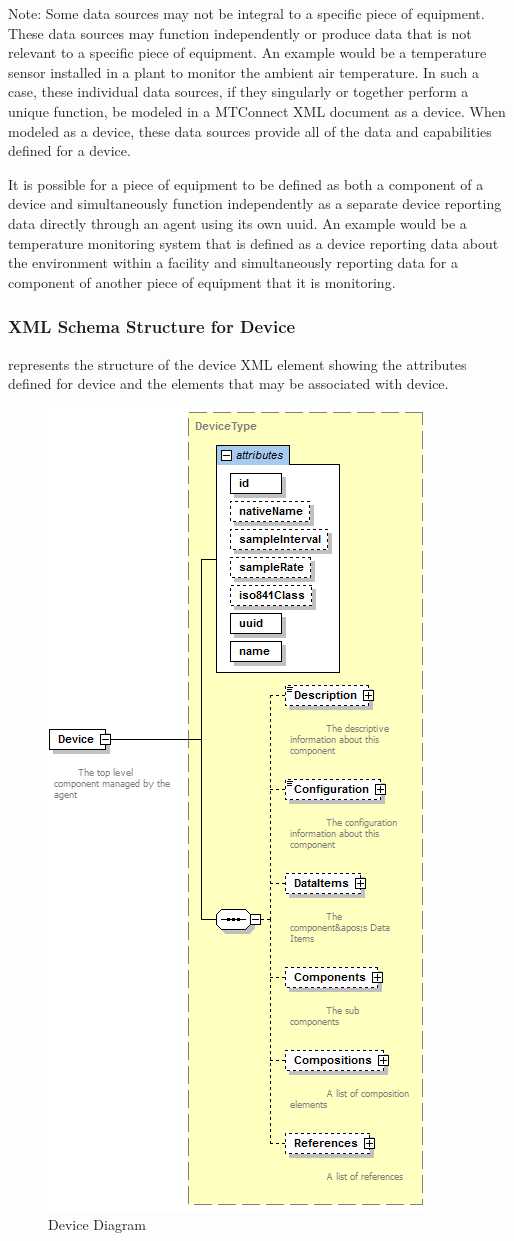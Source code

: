 

\begin{note}
Note: Some data sources may not be integral to a specific piece of equipment. These data sources may function independently or produce data that is not relevant to a specific piece of equipment. An example would be a temperature sensor installed in a plant to monitor the ambient air temperature. In such a case, these individual data sources, if they singularly or together perform a unique function, \may be modeled in a MTConnect XML document as a \gls{device}. When modeled as a \gls{device}, these data sources \must provide all of the data and capabilities defined for a device.

\end{note}

It is possible for a piece of equipment to be defined as both a \gls{component} of a \gls{device} and simultaneously function independently as a separate \gls{device} reporting data directly through an \gls{agent} using its own \gls{uuid}.  An example would be a temperature monitoring system that is defined as a \gls{device} reporting data about the environment within a facility and simultaneously reporting data for a \gls{component} of another piece of equipment that it is monitoring. 

\subsubsection{XML Schema Structure for Device}

 represents the structure of the \gls{device} XML element showing the attributes defined for \gls{device} and the elements that may be associated with \gls{device}.

\begin{figure}[ht]
  \centering
  \includegraphics[width=.4\textwidth]{figures/device-schema-diagram.png}
  \caption{Device Diagram}
  \label{fig:device-schema-diagram}
\end{figure}

